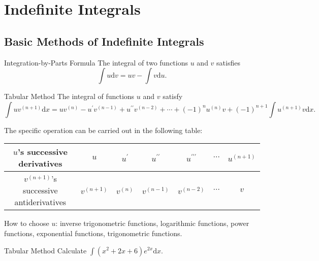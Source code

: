 
\section{Indefinite Integrals}

\subsection{Basic Methods of Indefinite Integrals}

\begin{proposition}{Integration-by-Parts Formula}{}
  The integral of two functions $u$ and $v$ satisfies
  \begin{equation}
    \int u \mathrm{d} v = uv - \int v \mathrm{d} u.
  \end{equation}
\end{proposition}

\begin{corollary}{Tabular Method}{}
  The integral of functions $u$ and $v$ satisfy
  \begin{equation}
    \int u v^{(n+1)} \mathrm{d} x
    = uv^{(n)} - u^{\prime}v^{(n-1)} + u^{\prime\prime} v^{(n-2)}
    + \cdots + (-1)^n u^{(n)}v + (-1)^{n+1} \int u^{(n+1)}v \mathrm{d} x.
  \end{equation}
\end{corollary}

The specific operation can be carried out in the following table:
\begin{table}[htbp]
  \centering
  \begin{tabular}{c|c|c|c|c|c|c}
    \hline
    $u$'s successive derivatives&$u$&$u^{\prime}$&$u^{\prime\prime}$&$u^{\prime\prime\prime}$&$\cdots$&$u^{(n+1)}$ \\ \hline
    $v^{(n+1)}$'s successive antiderivatives&$v^{(n+1)}$&$v^{(n)}$&$v^{(n-1)}$&$v^{(n-2)}$&$\cdots$&$v$\\ \hline
  \end{tabular}
\end{table}

\begin{note}
  How to choose $u$: inverse trigonometric functions,  logarithmic functions,
  power functions, exponential functions, trigonometric functions.
\end{note}

\begin{example}{Tabular Method}{}
  Calculate $\int (x^2 + 2x + 6) e^{2x}\mathrm{d} x$.
\end{example}

